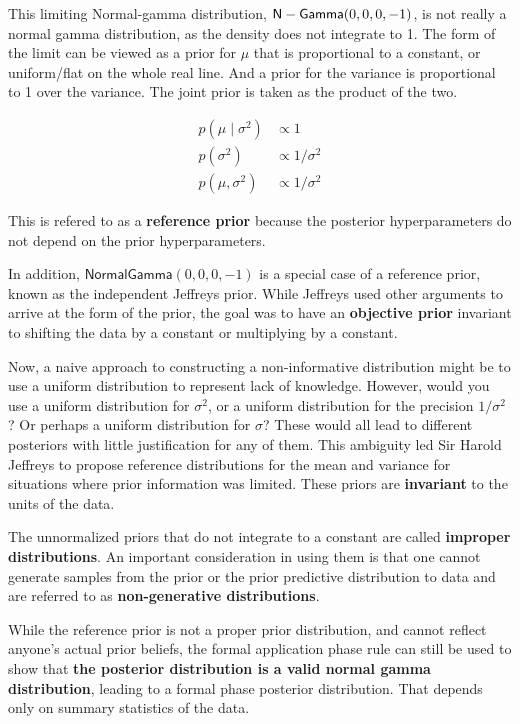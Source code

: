 \documentclass[]{book}
\theoremstyle{definition}
\theoremstyle{definition}
\theoremstyle{definition}
\theoremstyle{remark}
\begin{document}
This limiting Normal-gamma distribution, \(\textsf{N}-\textsf{Gamma}(0,0,0,-1)\), is not
really a normal gamma distribution, as the density does not integrate to
1. The form of the limit can be viewed as a prior for \(\mu\) that is
proportional to a constant, or uniform/flat on the whole real line. And
a prior for the variance is proportional to 1 over the variance. The
joint prior is taken as the product of the two.

\[\begin{aligned}
p(\mu \mid \sigma^2) & \propto  1 \\
p(\sigma^2) & \propto  1/\sigma^2 \\
p(\mu, \sigma^2) & \propto  1/\sigma^2
\end{aligned}\]

This is refered to as a \textbf{reference prior} because the posterior
hyperparameters do not depend on the prior hyperparameters.

In addition, \(\textsf{NormalGamma}(0,0,0,-1)\) is a special case of a
reference prior, known as the independent Jeffreys prior. While Jeffreys
used other arguments to arrive at the form of the prior, the goal was to
have an \textbf{objective prior} invariant to shifting the data by a
constant or multiplying by a constant.

Now, a naive approach to constructing a non-informative distribution
might be to use a uniform distribution to represent lack of knowledge.
However, would you use a uniform distribution for \(\sigma^2\), or a
uniform distribution for the precision \(1/\sigma^2\)? Or perhaps a
uniform distribution for \(\sigma\)? These would all lead to different
posteriors with little justification for any of them. This ambiguity led
Sir Harold Jeffreys to propose reference distributions for the mean and
variance for situations where prior information was limited. These
priors are \textbf{invariant} to the units of the data.

The unnormalized priors that do not integrate to a constant are called
\textbf{improper distributions}. An important consideration in using
them is that one cannot generate samples from the prior or the prior
predictive distribution to data and are referred to as
\textbf{non-generative distributions}.

While the reference prior is not a proper prior distribution, and cannot
reflect anyone's actual prior beliefs, the formal application phase rule
can still be used to show that \textbf{the posterior distribution is a
valid normal gamma distribution}, leading to a formal phase posterior
distribution. That depends only on summary statistics of the data.
\end{document}
